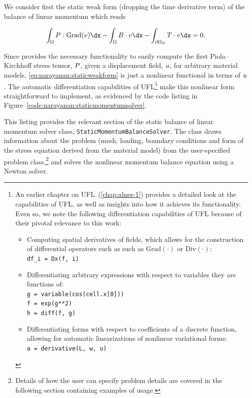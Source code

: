 We consider first the static weak form (dropping the time derivative
term) of the balance of linear momentum which reads

\begin{equation}
  \int_{\Omega} \bP:\mathrm{Grad}(\bv) \dx - \int_{\Omega} \bB
  \cdot \bv \dx -  \int_{\partial\Omega_{\mathrm{N}}} \bT \cdot
  \bv \ds = 0.
\label{eq:narayanan:staticweakform}
\end{equation}

\noindent Since \twist{} provides the necessary functionality to
easily compute the first Piola--Kirchhoff stress tensor, $\mbox{$ P$}$, given
a displacement field, $\mbox{$ u$}$, for arbitrary material models,
\eqref{eq:narayanan:staticweakform} is just a nonlinear functional in
terms of $\mbox{$ u$}$. The automatic differentiation capabilities of
UFL\footnote{An earlier chapter on UFL~(\ref{chap:alnes-1}) provides a
detailed look at the capabilities of UFL, as well as insights into how
it achieves its functionality. Even so, we note the following
differentiation capabilities of UFL because of their pivotal relevance
to this work:

\begin{itemize}
\item Computing spatial derivatives of fields, which allows for the
  construction of differential operators such as such as
  $\mathrm{Grad(\cdot)}$ or $\mathrm{Div(\cdot)}$:\\
  \texttt{df\_i = Dx(f, i)}
\item Differentiating arbitrary expressions with respect to variables
  they are functions of:\\
\texttt{g = variable(cos(cell.x[0]))}\\
\texttt{f = exp(g**2)}\\
\texttt{h = diff(f, g)}
\item Differentiating forms with respect to coefficients of a discrete
  function, allowing for automatic linearizations of nonlinear
  variational forms:\\
\texttt{a = derivative(L, w, u)}
\end{itemize}} make
this nonlinear form straightforward to implement, as evidenced by the
code listing in Figure~\ref{code:narayanan:staticmomentumsolver}.

This listing provides the relevant section of the static balance of
linear momentum solver class, {\tt StaticMomentumBalanceSolver}. The
class draws information about the problem (mesh, loading, boundary
conditions and form of the stress equation derived from the material
model) from the user-specified problem class,\footnote{Details of how
the user can specify problem details are covered in the following
section containing examples of \twist{} usage.} and solves the
nonlinear momentum balance equation using a Newton solver.

